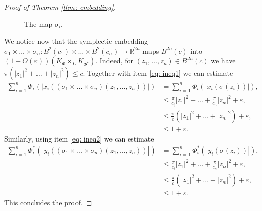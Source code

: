 \documentclass{article}
\theoremstyle{definition}
\begin{document}
\begin{proof}[Proof of Theorem \ref{thm: embedding}]
\begin{figure}[htbp]
\caption{The map $\sigma_i$.} %
    
\end{figure}
We notice now that the symplectic embedding $\sigma_1\times\ldots\times\sigma_n: B^2(c_1) \times\ldots\times B^2(c_n) \to \mathbb{R}^{2n}$ maps $B^{2n}(c)$ into $(1+O(\varepsilon))(K_{\Phi}\times_L K_{\Phi^*})$. Indeed, for $(z_1,\ldots,z_n)\in B^{2n}(c)$ we have $\pi(|z_1|^2+\ldots+|z_n|^2) \leq c$. Together with item \eqref{eq: ineq1} we can estimate
\begin{equation*}
\begin{split}
 \sum_{i=1}^n\Phi_i(|x_i\left((\sigma_1\times\ldots\times \sigma_n)(z_1,\ldots,z_n)\right)|)&=\sum_{i=1}^n\Phi_i(|x_i(\sigma(z_i))|),\\
 &\leq \frac{\pi}{c_i}|z_1|^2+\ldots+\frac{\pi}{c_n}|z_n|^2+\varepsilon,\\
&\leq \frac{\pi}{c}(|z_1|^2+\ldots+|z_n|^2)+\varepsilon,\\
&\leq 1+\varepsilon.
\end{split}
\end{equation*}
Similarly, using item \eqref{eq: ineq2} we can estimate
\begin{equation*}
\begin{split}
 \sum_{i=1}^n\Phi^*_i(|y_i\left((\sigma_1\times\ldots\times \sigma_n)(z_1,\ldots,z_n)\right)|)&=\sum_{i=1}^n\Phi^*_i(|y_i(\sigma(z_i))|),\\
  &\leq \frac{\pi}{c_i}|z_1|^2+\ldots+\frac{\pi}{c_n}|z_n|^2+\varepsilon,\\
&\leq\frac{\pi}{c}(|z_1|^2+\ldots+|z_n|^2)+\varepsilon,\\
&\leq 1+\varepsilon.
\end{split}
\end{equation*}
This concludes the proof.
\end{proof}
\end{document}
